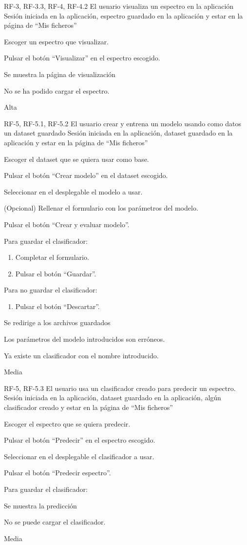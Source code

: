 {RF-3, RF-3.3, RF-4, RF-4.2}
{El usuario visualiza un espectro en la aplicación}
{Sesión iniciada en la aplicación, espectro guardado en la aplicación y estar 
en la página de ``Mis ficheros''}
{
	\item Escoger un espectro que visualizar.
	\item Pulsar el botón ``Visualizar'' en el espectro escogido.
}
{Se muestra la página de visualización}
{	\item No se ha podido cargar el espectro.
}
{Alta}

{RF-5, RF-5.1, RF-5.2}
{El usuario crear y entrena un modelo usando como datos un dataset guardado}
{Sesión iniciada en la aplicación, dataset guardado en la aplicación y estar en 
la página de ``Mis ficheros''}
{
	\item Escoger el dataset que se quiera usar como base.
	\item Pulsar el botón ``Crear modelo'' en el dataset escogido.
	\item Seleccionar en el desplegable el modelo a usar.
	\item (Opcional) Rellenar el formulario con los parámetros del modelo.
	\item Pulsar el botón ``Crear y evaluar modelo''.
	\item Para guardar el clasificador:
	\begin{enumerate}
		\item Completar el formulario.
		\item Pulsar el botón ``Guardar''.
	\end{enumerate}
	\item Para no guardar el clasificador:
	\begin{enumerate}
		\item Pulsar el botón ``Descartar''.
	\end{enumerate}
}
{Se redirige a los archivos guardados}
{	\item Los parámetros del modelo introducidos son erróneos.
	\item Ya existe un clasificador con el nombre introducido.
}
{Media}

{RF-5, RF-5.3}
{El usuario usa un clasificador creado para predecir un espectro.}
{Sesión iniciada en la aplicación, dataset guardado en la aplicación, algún 
clasificador creado y estar en la página de ``Mis ficheros''}
{
	\item Escoger el espectro que se quiera predecir.
	\item Pulsar el botón ``Predecir'' en el espectro escogido.
	\item Seleccionar en el desplegable el clasificador a usar.
	\item Pulsar el botón ``Predecir espectro''.
	\item Para guardar el clasificador:
}
{Se muestra la predicción}
{	\item No se puede cargar el clasificador.
}
{Media}

